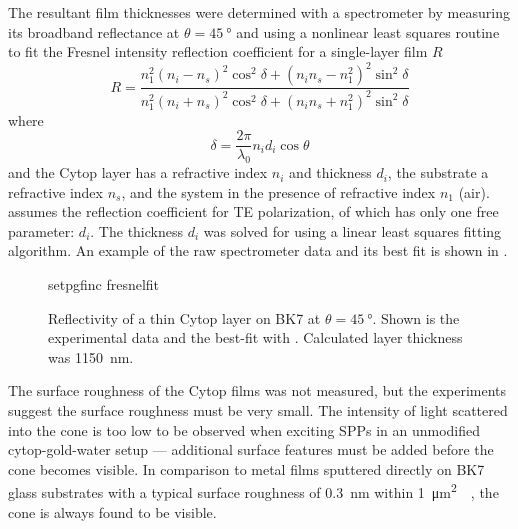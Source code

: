 The resultant film thicknesses were determined with a spectrometer by
measuring its broadband reflectance at $\theta=\SI{45}{\degree}$ and using
a nonlinear least squares routine~\cite{more1977LevAlgImpThe_2} to
fit the Fresnel intensity reflection coefficient for a single-layer
film $R$~\cite{steck2006classical}
\begin{equation}
				R = \frac{n_1^2{(n_i-n_s)}^2 \cos^2\delta + {(n_i n_s - n_1^2)}^2\sin^2\delta}
				{n_1^2{(n_i+n_s)}^2 \cos^2\delta + {(n_i n_s + n_1^2)}^2\sin^2\delta}
          \label{eqn:fitfresnel}
\end{equation}
where
\begin{equation}
 \delta = \frac{2\pi}{\lambda_0} n_i d_i \cos \theta
\end{equation}
and the Cytop layer has a refractive index $n_i$ and thickness $d_i$, the
substrate a refractive index $n_s$, and the system in the presence of
refractive index $n_1$ (air).   assumes the
reflection coefficient for TE polarization, of which 
has only one free parameter: $d_i$.  The thickness $d_i$ was solved for using
a linear least squares fitting algorithm.  An example of the raw spectrometer
data and its best fit is shown in .

\begin{figure}
 \centering
 {setpgfinc}
 {fresnelfit}
 \caption{Reflectivity of a thin Cytop layer on BK7 at
 $\theta=\SI{45}{\degree}$.  Shown is the experimental data and the
	best-fit with .  Calculated layer thickness was \SI{1150}{\nano\meter}.}
\label{fig:fresnelfit}
\end{figure}

The surface roughness of the Cytop films was not measured, but the experiments
suggest the surface roughness must be very small.  The intensity of light
scattered into the cone is too low to be observed when exciting SPPs in an
unmodified cytop-gold-water setup --- additional surface features must be
added before the cone becomes visible.  In comparison to metal films sputtered
directly on BK7 glass substrates with a typical surface roughness of
\SI{0.3}{\nano\meter} within
\SI{1}{\micro\meter\squared}~\cite{cheang2011study}~\cite{chiu2011optimizing},
the cone is always found to be visible.
